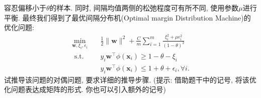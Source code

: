 \documentclass[a4paper,UTF8]{article}
\numberwithin{equation}{section}
\theoremstyle{definition}
\def \x {\boldsymbol{x}}
\begin{document}
\begin{enumerate}
    容忍偏移小于$\theta$的样本. 同时, 间隔均值两侧的松弛程度可有所不同, 使用参数$\mu$进行平衡. 最终我们得到了最优间隔分布机(Optimal margin Distribution Machine)的优化问题:
    \begin{align*}
        \min _{\boldsymbol{w}, \xi_i, \epsilon_i} & \quad \frac{1}{2}\|\boldsymbol{w}\|^2+ \frac{C}{m} \sum_{i=1}^m \frac{\xi_i^2+\mu \epsilon_i^2}{(1-\theta)^2} \\
        \text { s.t. } & \quad y_i \boldsymbol{w}^{\top} \phi\left(\x_i\right) \geq 1-\theta-\xi_i \\
        & \quad y_i \boldsymbol{w}^{\top} \phi\left(\x_i\right) \leq 1+\theta+\epsilon_i, \forall i.
    \end{align*}
    试推导该问题的对偶问题, 要求详细的推导步骤.
    (提示: 借助题干中的记号, 将该优化问题表达成矩阵的形式. 你也可以引入额外的记号)
\end{enumerate}
\end{document}
